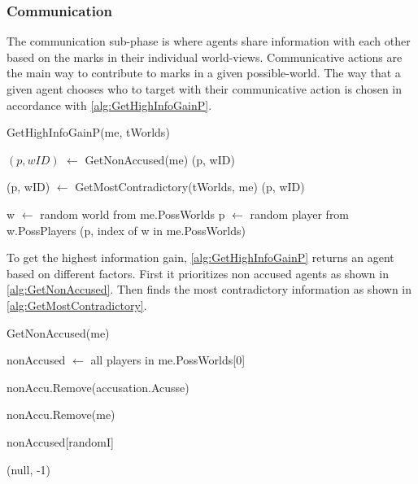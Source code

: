 \subsubsection{Communication}\label{sec:communication}
The communication sub-phase is where agents share information with each other
based on the marks in their individual world-views. Communicative actions are
the main way to contribute to marks in a given possible-world. The way that a
given agent chooses who to target with their communicative action is chosen in
accordance with \cref{alg:GetHighInfoGainP}.
\begin{algorithm}[H]
	\caption{GetHighInfoGainP(me, tWorlds)}
	\begin{algorithmic}
		\State $(p, wID)$ $\gets$ GetNonAccused(me)
		\State \Return (p, wID)
		\EndIf
		\EndIf

		\State (p, wID) $\gets$ GetMostContradictory(tWorlds, me)
		\State \Return (p, wID)
		\EndIf

		\State w $\gets$ random world from me.PossWorlds \State
		p $\gets$ random player from w.PossPlayers \State \Return (p, index of w in
		me.PossWorlds)
	\end{algorithmic}\label{alg:GetHighInfoGainP}
\end{algorithm}
\setcounter{algorithmcaption}{2}
To get the highest information gain, \cref{alg:GetHighInfoGainP} returns an
agent based on different factors.
First it prioritizes non accused agents as shown in
\cref{alg:GetNonAccused}.
Then finds the most contradictory information as shown in
\cref{alg:GetMostContradictory}. \\
\begin{algorithm}[H]
	\caption{GetNonAccused(me)}
	\begin{algorithmic}
		\State nonAccused $\gets$ all players in me.PossWorlds[0]
		\EndIf

		\State nonAccu.Remove(accusation.Acusse)
		\EndFor

		\State nonAccu.Remove(me)

		\State \Return nonAccused[randomI]
		\EndIf

		\State \Return (null, -1)
	\end{algorithmic}\label{alg:GetNonAccused}
\end{algorithm}

